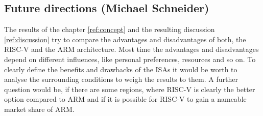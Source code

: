 \documentclass[conference]{IEEEtran}
\begin{document}
	\subsection{Future directions (Michael Schneider)}
	\label{ref:future}

	The results of the chapter \ref{ref:concept} and the resulting discussion \ref{ref:discussion} try to compare the advantages and disadvantages of both, the RISC-V and the ARM architecture. Most time the advantages and disadvantages depend on different influences, like personal preferences, resources and so on. To clearly define the benefits and drawbacks of the \glspl{ISA} it would be worth to analyse the surrounding conditions to weigh the results to them. A further question would be, if there are some regions, where RISC-V is clearly the better option compared to ARM and if it is possible for RISC-V to gain a nameable market share of ARM. 


\end{document}

